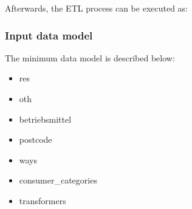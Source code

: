 \documentclass[letterpaper,10pt,english]{sphinxmanual}
\begin{document}
\begin{DUlineblock}{0em}
\item[] Afterwards, the ETL process can be executed as:
\end{DUlineblock}

\begin{sphinxVerbatim}[commandchars=\\\{\}]
 
\end{sphinxVerbatim}


\subsubsection{Input data model}
\label{\detokenize{docs_pylovo/installation:input-data-model}}
\sphinxAtStartPar
The minimum data model is described below:
\begin{itemize}
\item {} 
\sphinxAtStartPar
res

\item {} 
\sphinxAtStartPar
oth

\item {} 
\sphinxAtStartPar
betriebsmittel

\item {} 
\sphinxAtStartPar
postcode

\item {} 
\sphinxAtStartPar
ways

\item {} 
\sphinxAtStartPar
consumer\_categories

\item {} 
\sphinxAtStartPar
transformers

\end{itemize}
\end{document}
